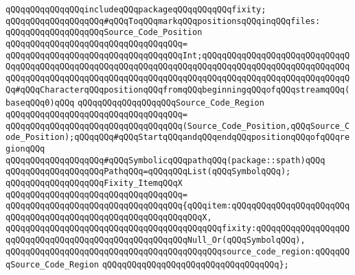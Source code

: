 \verb|qQQqqQQqqQQqqQQqincludeqQQqpackageqQQqqQQqqQQqfixity;|\newline
\newline
\newline
\verb|qQQqqQQqqQQqqQQqqQQq#qQQqToqQQqmarkqQQqpositionsqQQqinqQQqfiles:|\newline
\newline
\verb|qQQqqQQqqQQqqQQqqQQqSource_Code_Position|\newline
\verb|qQQqqQQqqQQqqQQqqQQqqQQqqQQqqQQqqQQq=|\newline
\verb|qQQqqQQqqQQqqQQqqQQqqQQqqQQqqQQqqQQqInt;qQQqqQQqqQQqqQQqqQQqqQQqqQQqqQQqqQQqqQQqqQQqqQQqqQQqqQQqqQQqqQQqqQQqqQQqqQQqqQQqqQQqqQQqqQQqqQQqqQQqqQQqqQQqqQQqqQQqqQQqqQQqqQQqqQQqqQQqqQQqqQQqqQQqqQQqqQQqqQQqqQQqqQQqqQQq#qQQqCharacterqQQqpositionqQQqfromqQQqbeginningqQQqofqQQqstreamqQQq(baseqQQq0)qQQq|\newline
\newline
\verb|qQQqqQQqqQQqqQQqqQQqSource_Code_Region|\newline
\verb|qQQqqQQqqQQqqQQqqQQqqQQqqQQqqQQqqQQq=|\newline
\verb|qQQqqQQqqQQqqQQqqQQqqQQqqQQqqQQqqQQq(Source_Code_Position,qQQqSource_Code_Position);qQQqqQQq#qQQqStartqQQqandqQQqendqQQqpositionqQQqofqQQqregionqQQq|\newline
\newline
\newline
\verb|qQQqqQQqqQQqqQQqqQQq#qQQqSymbolicqQQqpathqQQq(package::spath)qQQq|\newline
\newline
\verb|qQQqqQQqqQQqqQQqqQQqPathqQQq=qQQqqQQqList(qQQqSymbolqQQq);|\newline
\newline
\verb|qQQqqQQqqQQqqQQqqQQqFixity_ItemqQQqX|\newline
\verb|qQQqqQQqqQQqqQQqqQQqqQQqqQQqqQQqqQQq=|\newline
\verb|qQQqqQQqqQQqqQQqqQQqqQQqqQQqqQQqqQQq{qQQqitem:qQQqqQQqqQQqqQQqqQQqqQQqqQQqqQQqqQQqqQQqqQQqqQQqqQQqqQQqqQQqqQQqX,|\newline
\verb|qQQqqQQqqQQqqQQqqQQqqQQqqQQqqQQqqQQqqQQqqQQqfixity:qQQqqQQqqQQqqQQqqQQqqQQqqQQqqQQqqQQqqQQqqQQqqQQqqQQqqQQqNull_Or(qQQqSymbolqQQq),|\newline
\verb|qQQqqQQqqQQqqQQqqQQqqQQqqQQqqQQqqQQqqQQqqQQqsource_code_region:qQQqqQQqSource_Code_Region|\newline
\verb|qQQqqQQqqQQqqQQqqQQqqQQqqQQqqQQqqQQq};|\newline
\newline
